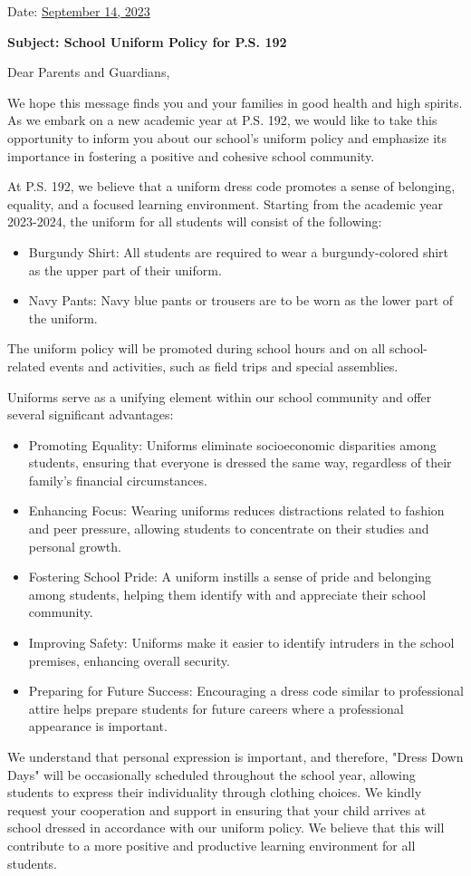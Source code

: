 \documentclass[12pt,letterpaper]{article}
\begin{document}
\vspace*{0.5in}
Date: \href{https://www.ps192.org/apps/bbmessages/show_bbm.jsp?REC_ID=139439}{September 14, 2023} 

\textbf{Subject: School Uniform Policy for P.S. 192}

Dear Parents and Guardians,

We hope this message finds you and your families in good health and high spirits. As we embark on a new
academic year at P.S. 192, we would like to take this opportunity to inform you about our school's uniform policy
and emphasize its importance in fostering a positive and cohesive school community.

At P.S. 192, we believe that a uniform dress code promotes a sense of belonging, equality, and a focused learning
environment. Starting from the academic year 2023-2024, the uniform for all students will consist of the following:
\begin{itemize}
	\item Burgundy Shirt: All students are required to wear a burgundy-colored shirt as the upper part of
their uniform.
	\item Navy Pants: Navy blue pants or trousers are to be worn as the lower part of the uniform.
\end{itemize}
The uniform policy will be promoted during school hours and on all school-related events and activities, such as
field trips and special assemblies.

Uniforms serve as a unifying element within our school community and offer several significant advantages:
		\begin{itemize}
		\item Promoting Equality: Uniforms eliminate socioeconomic disparities among students, ensuring that everyone is dressed the same way, regardless of their family's financial circumstances.
		\item Enhancing Focus: Wearing uniforms reduces distractions related to fashion and peer pressure,
allowing students to concentrate on their studies and personal growth.
		\item Fostering School Pride: A uniform instills a sense of pride and belonging among students, helping
them identify with and appreciate their school community.
		\item Improving Safety: Uniforms make it easier to identify intruders in the school premises, enhancing
overall security.
		\item Preparing for Future Success: Encouraging a dress code similar to professional attire helps
prepare students for future careers where a professional appearance is important.
		\end{itemize}
We understand that personal expression is important, and therefore, "Dress Down Days" will be occasionally scheduled throughout the school year, allowing
students to express their individuality through clothing choices.
\pagebreak
\vspace*{1.5cm}
We kindly request your cooperation and support in ensuring that your child
arrives at school dressed in accordance with our uniform policy. We believe that
this will contribute to a more positive and productive learning environment for
all students.
\end{document}
